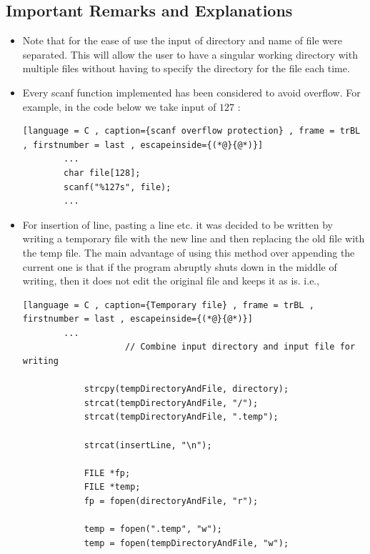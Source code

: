 \documentclass[a4paper]{article}
\theoremstyle{plain}
\theoremstyle{definition}
\theoremstyle{remark}
\begin{document}
\subsection{Important Remarks and Explanations}
\begin{itemize}
	\item Note that for the ease of use the input of directory and name of file were separated. This will allow the user to have a singular working directory with multiple files without having to specify the directory for the file each time.
	\item Every scanf function implemented has been considered to avoid overflow. For example, in the code below we take input of $127$ :
		\begin{lstlisting}[language = C , caption={scanf overflow protection} , frame = trBL , firstnumber = last , escapeinside={(*@}{@*)}]
		...
		char file[128];
		scanf("%127s", file);
		...
		\end{lstlisting}
	\item For insertion of line, pasting a line etc. it was decided to be written by writing a temporary file with the new line and then replacing the old file with the temp file. The main advantage of using this method over appending the current one is that if the program abruptly shuts down in the middle of writing, then it does not edit the original file and keeps it as is. i.e., 
		\begin{lstlisting}[language = C , caption={Temporary file} , frame = trBL , firstnumber = last , escapeinside={(*@}{@*)}]
		...
					// Combine input directory and input file for writing

			strcpy(tempDirectoryAndFile, directory);
			strcat(tempDirectoryAndFile, "/");
			strcat(tempDirectoryAndFile, ".temp");

			strcat(insertLine, "\n");

			FILE *fp;
			FILE *temp;
			fp = fopen(directoryAndFile, "r");

			temp = fopen(".temp", "w");
			temp = fopen(tempDirectoryAndFile, "w");
			

\end{lstlisting}
\end{itemize}
\end{document}
